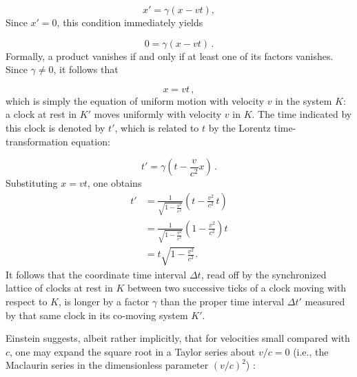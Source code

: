 \documentclass[submitted,12pt]{article}
\begin{document}
\begin{equation*}
x'=\gamma(x-vt),
\end{equation*}
%
Since $x'=0$, this condition immediately yields

\begin{equation*}
0=\gamma(x-vt)\,.
\end{equation*}
%
Formally, a product vanishes if and only if at least one of its factors vanishes. Since $\gamma \neq 0$, it follows that

\begin{equation*}
x=vt\,,
\end{equation*}
%
which is simply the equation of uniform motion with velocity $v$ in the system $K$: a clock at rest in $K'$ moves uniformly with velocity $v$ in $K$. The time indicated by this clock is denoted by $t'$, which is related to $t$ by the Lorentz time-transformation equation:

\begin{equation*}
t'=\gamma\!\left(t-\frac{v}{c^{2}}x\right)\,.
\end{equation*}
%
Substituting $x=vt$, one obtains
%
\begin{equation*}
\begin{aligned}
t'
&=\frac{1}{\sqrt{1-\frac{v^{2}}{c^{2}}}}
\left(t-\frac{v^{2}}{c^{2}}\,t\right)\\[6pt]
&=\frac{1}{\sqrt{1-\frac{v^{2}}{c^{2}}}}
\left(1-\frac{v^{2}}{c^{2}}\right)t\\[6pt]
&=t\sqrt{1-\frac{v^{2}}{c^{2}}}.
\end{aligned}
\end{equation*}%
%
It follows that the coordinate time interval $\Delta t$, read off by the synchronized lattice of clocks at rest in $K$ between two successive ticks of a clock moving with respect to $K$, is longer by a factor $\gamma$ than the proper time interval $\Delta t'$ measured by that same clock in its co-moving system $K'$.

Einstein suggests, albeit rather implicitly, that for velocities small compared with $c$, one may expand the square root in a Taylor series about $v/c=0$ (i.e., the Maclaurin series in the dimensionless parameter $(v/c)^{2}$)%
%
%
%
:
\end{document}
